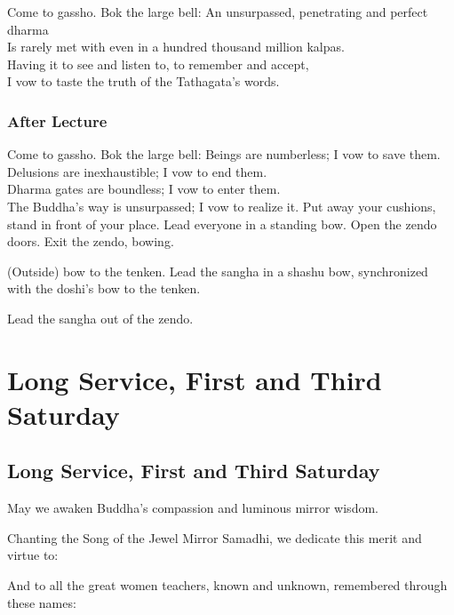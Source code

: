 \documentclass{chantbook}
\begin{document}
\begin{services}
\doshi Come to gassho.
\doan Bok the large bell: \bigspace\bok
\sangha An unsurpassed, penetrating and perfect dharma\\
Is rarely met with even in a hundred thousand million kalpas.\\
Having it to see and listen to, to remember and accept,\\
I vow to taste the truth of the Tathagata's words.

\newpage

\section*{After Lecture}
\doshi Come to gassho.
\doan Bok the large bell: \bigspace\bok
\sangha Beings are numberless; I vow to save them.\\
Delusions are inexhaustible; I vow to end them.\\
Dharma gates are boundless; I vow to enter them.\\
The Buddha's way is unsurpassed; I vow to realize it.
\sangha Put away your cushions, stand in front of your place.
\doshi Lead everyone in a standing bow.
\tenken Open the zendo doors.
\doshi Exit the zendo, bowing.

(Outside) bow to the tenken.
\doan Lead the sangha in a shashu bow, synchronized with the doshi's bow to
the tenken.

Lead the sangha out of the zendo.

\part{Long Service, First and Third Saturday}
\chapter{Long Service, First and Third Saturday}
\begin{service}
\kokyo \makaHannyaHaramittaShingyo
\kokyo \enmeiJukkuKannonGyo
\kokyo {}
\sangha \allBuddhas
\kokyo \songOfTheJewelMirrorSamadhi
\kokyo May we awaken Buddha's compassion and luminous mirror wisdom.

Chanting the Song of the Jewel Mirror Samadhi, we dedicate this merit and
virtue to: \bigspace\clank

\ancestorsShort

\kokyo And to all the great women teachers, known and unknown, remembered
through these names: \bigspace\clank


\end{service}
\end{services}
\end{document}
